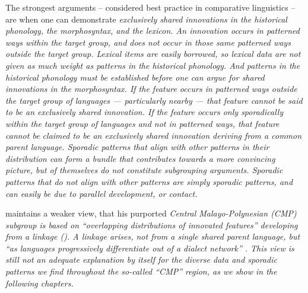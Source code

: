 The strongest arguments -- considered best practice in comparative linguistics -- are
when one can demonstrate \it{exclusively shared innovations} in the historical phonology,
the morphosyntax, and the lexicon.
An innovation occurs in patterned ways within the target group,
and does not occur in those same patterned ways outside the target group.
Lexical items are easily borrowed,
so lexical data are not given as much weight as patterns in the historical phonology.
And patterns in the historical phonology must be established
before one can argue for shared innovations in the morphosyntax.
If the feature occurs in patterned ways outside the target group of languages
--- particularly nearby ---
that feature cannot be said to be an exclusively shared innovation.
If the feature occurs only sporadically within the target group of languages
and not in patterned ways,
that feature cannot be claimed to be an exclusively shared innovation
deriving from a common parent language.
Sporadic patterns that align with other patterns in their distribution
can form a bundle that contributes towards a more convincing picture,
but of themselves do not constitute subgrouping arguments.
Sporadic patterns that do not align with other patterns are simply sporadic patterns,
and can easily be due to parallel development,
or contact.

\citet{Blust1993,Blust2013} maintains a weaker view,
that his purported \it{Central Malayo-Polynesian} (CMP) subgroup is based on
“overlapping distributions of innovated features”
developing from a linkage (\citeyear[242]{Blust1993}).
A linkage arises,
not from a single shared parent language,
but “as languages progressively differentiate out of a dialect network” \citep{Ross2017}.
This view is still not an adequate explanation by itself for the diverse data
and sporadic patterns we find throughout the so-called “CMP” region,
as we show in the following chapters.

